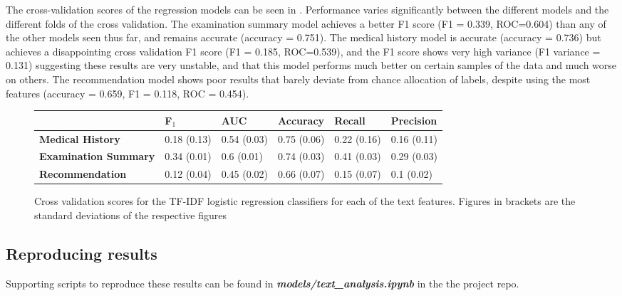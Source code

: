    The cross-validation scores of the regression models can be seen in . Performance varies significantly between the different models and the different folds of the cross validation. The examination summary model achieves a better F1 score (F1 = 0.339, ROC=0.604) than any of the other models seen thus far, and remains accurate (accuracy = 0.751). The medical history model is accurate (accuracy = 0.736) but achieves a disappointing cross validation F1 score (F1 = 0.185, ROC=0.539), and the F1 score shows very high variance (F1 variance = 0.131) suggesting these results are very unstable, and that this model performs much better on certain samples of the data and much worse on others. The recommendation model shows poor results that barely deviate from chance allocation of labels, despite using the most features (accuracy = 0.659, F1 = 0.118, ROC = 0.454).

   \begin{figure}[H]
       \scriptsize
       \centering
       \renewcommand{\arraystretch}{1.4}
       \begin{tabular}{P{30mm} P{17mm} P{17mm} P{17mm} P{17mm} P{17mm} }
           \toprule
           & \textbf{F$_1$} & \textbf{AUC} & \textbf{Accuracy} & \textbf{Recall} & \textbf{Precision} \\\toprule
           \textbf{Medical History}     & 0.18 (0.13) & 0.54 (0.03) & 0.75 (0.06) & 0.22 (0.16) & 0.16 (0.11) \\
           \textbf{Examination Summary} & 0.34 (0.01) & 0.6 (0.01) & 0.74 (0.03) & 0.41 (0.03) & 0.29 (0.03) \\
           \textbf{Recommendation}       & 0.12 (0.04) & 0.45 (0.02) & 0.66 (0.07) & 0.15 (0.07) & 0.1 (0.02) \\\toprule
       \end{tabular}
       \caption[Cross-validation of TF-IDF logistic regression models]{Cross validation scores for the TF-IDF logistic regression classifiers for each of the text features. Figures in brackets are the standard deviations of the respective figures}
       \label{fig:text-clf-scores}
   \end{figure}

   \subsection{Reproducing results}\label{subsec:reproducing-results-text}

   Supporting scripts to reproduce these results can be found in \textbf{\textit{models/text\_analysis.ipynb}} in the the project repo.

